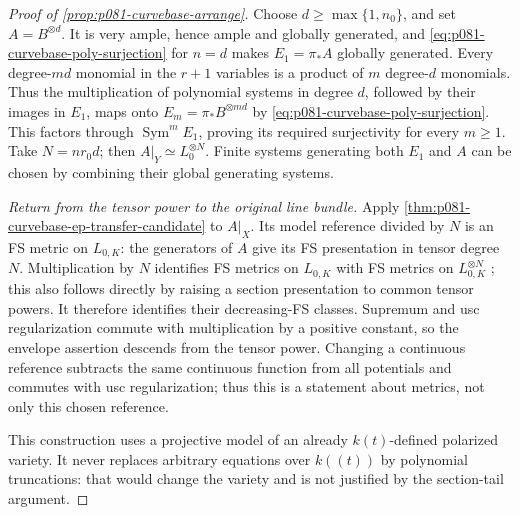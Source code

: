 \begin{proof}[Proof of \cref{prop:p081-curvebase-arrange}]
Choose \(d\geq\max\{1,n_0\}\), and set \(A=B^{\otimes d}\).
It is very ample, hence ample and globally generated, and
\eqref{eq:p081-curvebase-poly-surjection} for \(n=d\) makes
\(E_1=\pi_*A\) globally generated. Every degree-\(md\) monomial in
the \(r+1\) variables is a product of \(m\) degree-\(d\) monomials.
Thus the multiplication of polynomial systems in degree \(d\), followed
by their images in \(E_1\), maps onto \(E_m=\pi_*B^{\otimes md}\)
by \eqref{eq:p081-curvebase-poly-surjection}. This factors through
\(\operatorname{Sym}^m E_1\), proving its required surjectivity for
every \(m\geq1\). Take \(N=nr_0d\); then \(A|_Y\simeq L_0^{\otimes N}\).
Finite systems generating both \(E_1\) and \(A\) can be chosen by
combining their global generating systems.

\emph{Return from the tensor power to the original line bundle.}
Apply \cref{thm:p081-curvebase-ep-transfer-candidate} to \(A|_X\).
Its model reference divided by \(N\) is an FS metric on \(L_{0,K}\):
the generators of \(A\) give its FS presentation in tensor degree \(N\).
Multiplication by \(N\) identifies FS metrics on \(L_{0,K}\) with FS
metrics on \(L_{0,K}^{\otimes N}\)
\cite[Proposition~5.4(iii)]{BE2021}; this also follows directly by
raising a section presentation to common tensor powers. It therefore
identifies their decreasing-FS classes. Supremum and usc
regularization commute with multiplication by a positive constant,
so the envelope assertion descends from the tensor power.
Changing a continuous reference subtracts the same continuous
function from all potentials and commutes with usc regularization;
thus this is a statement about metrics, not only this chosen reference.

This construction uses a projective model of an already
\(k(t)\)-defined polarized variety. It never replaces arbitrary
equations over \(k((t))\) by polynomial truncations: that would change
the variety and is not justified by the section-tail argument.
\end{proof}
